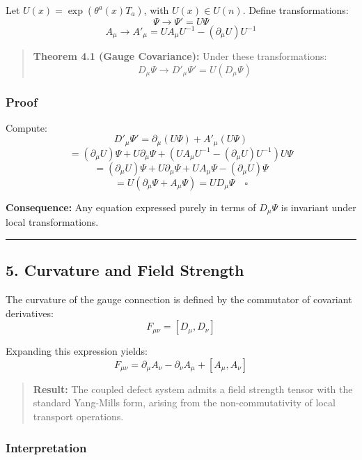 \documentclass[
]{article}
\begin{document}
Let \(U(x) = \exp(\theta^a(x) T_a)\), with \(U(x) \in U(n)\). Define
transformations: \[ \Psi \rightarrow \Psi' = U \Psi \]
\[ A_\mu \rightarrow A'_\mu = U A_\mu U^{-1} - (\partial_\mu U) U^{-1} \]

\begin{quote}
\textbf{Theorem 4.1 (Gauge Covariance):} Under these transformations:
\[ D_\mu \Psi \rightarrow D'_\mu \Psi' = U (D_\mu \Psi) \]
\end{quote}

\subsubsection{Proof}\label{proof-3}

Compute: \[ D'_\mu \Psi' = \partial_\mu (U\Psi) + A'_\mu (U\Psi) \]
\[ = (\partial_\mu U)\Psi + U \partial_\mu \Psi + \left(U A_\mu U^{-1} - (\partial_\mu U)U^{-1}\right) U\Psi \]
\[ = (\partial_\mu U)\Psi + U \partial_\mu \Psi + U A_\mu \Psi - (\partial_\mu U)\Psi \]
\[ = U(\partial_\mu \Psi + A_\mu \Psi) = U D_\mu \Psi \quad \square \]

\textbf{Consequence:} Any equation expressed purely in terms of
\(D_\mu \Psi\) is invariant under local transformations.

\begin{center}\rule{0.5\linewidth}{0.5pt}\end{center}

\subsection{5. Curvature and Field
Strength}\label{curvature-and-field-strength-1}

The curvature of the gauge connection is defined by the commutator of
covariant derivatives: \[ F_{\mu\nu} = [D_\mu, D_\nu] \]

Expanding this expression yields:
\[ F_{\mu\nu} = \partial_\mu A_\nu - \partial_\nu A_\mu + [A_\mu, A_\nu] \]

\begin{quote}
\textbf{Result:} The coupled defect system admits a field strength
tensor with the standard Yang-Mills form, arising from the
non-commutativity of local transport operations.
\end{quote}

\subsubsection{Interpretation}\label{interpretation-1}
\end{document}
